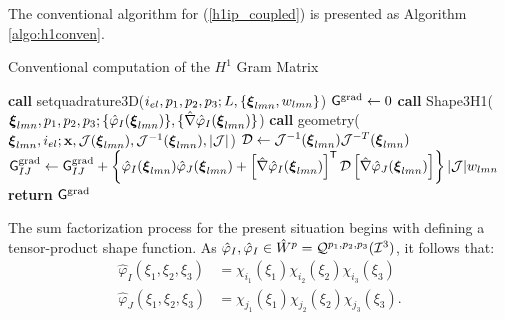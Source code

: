 The conventional algorithm for (\ref{h1ip_coupled}) is presented as Algorithm \ref{algo:h1conven}.
% 
\begin{algorithm}[ht]
\caption{Conventional computation of the $H^1$ Gram Matrix}\label{algo:h1conven}
\begin{algorithmic}
\State\textbf{call }setquadrature3D($i_{el},p_1,p_2,p_3;L,\{\boldsymbol{\xi}_{lmn},w_{lmn}\}$)
\State $\mathsf{G}^{\operatorname{grad}} \gets 0$
            \State\textbf{call } Shape3H1($\boldsymbol{\xi}_{lmn},p_1,p_2,p_3;\{\hat{\varphi}_I(\boldsymbol{\xi}_{lmn})\},\{\hat{\nabla}\hat{\varphi}_I(\boldsymbol{\xi}_{lmn})\}$)
            \State\textbf{call } geometry( $\boldsymbol{\xi}_{lmn},i_{el};\mathbf{x},\mathcal{J}(\boldsymbol{\xi}_{lmn}),\mathcal{J}^{-1}(\boldsymbol{\xi}_{lmn}),|\mathcal{J}|$)
            \State $\mathcal{D}\gets\mathcal{J}^{-1}(\boldsymbol{\xi}_{lmn})\mathcal{J}^{-T}(\boldsymbol{\xi}_{lmn})$
                    \State $\mathsf{G}_{IJ}^{\operatorname{grad}} \gets \mathsf{G}_{IJ}^{\operatorname{grad}}+\left\{\hat{\varphi}_I(\boldsymbol{\xi}_{lmn})\hat{\varphi}_J(\boldsymbol{\xi}_{lmn})+\left[\hat{\nabla}\hat{\varphi}_I(\boldsymbol{\xi}_{lmn})\right]^{\mathsf{T}}\mathcal{D}\left[\hat{\nabla}\hat{\varphi}_J(\boldsymbol{\xi}_{lmn})\right]\right\}|\mathcal{J}|w_{lmn}$
                \EndFor
            \EndFor            
\EndFor
\State \textbf{return} $\mathsf{G}^{\operatorname{grad}}$
\EndProcedure
\end{algorithmic}
\end{algorithm}

The sum factorization process for the present situation begins with defining a tensor-product shape function. As $\hat{\varphi}_I,\hat{\varphi}_I\in \hat{W}^p=\mathcal{Q}^{p_1,p_2,p_3}(\mathcal{I}^3)$, it follows that:
% 
\begin{equation}
    \begin{aligned}
    \hat{\varphi}_I(\xi_1,\xi_2,\xi_3)&= \chi_{i_1}(\xi_1)\chi_{i_2}(\xi_2)\chi_{i_3}(\xi_3)\\
    \hat{\varphi}_J(\xi_1,\xi_2,\xi_3)&= \chi_{j_1}(\xi_1)\chi_{j_2}(\xi_2)\chi_{j_3}(\xi_3).
    \end{aligned}
    \label{h1tensor}
\end{equation}

